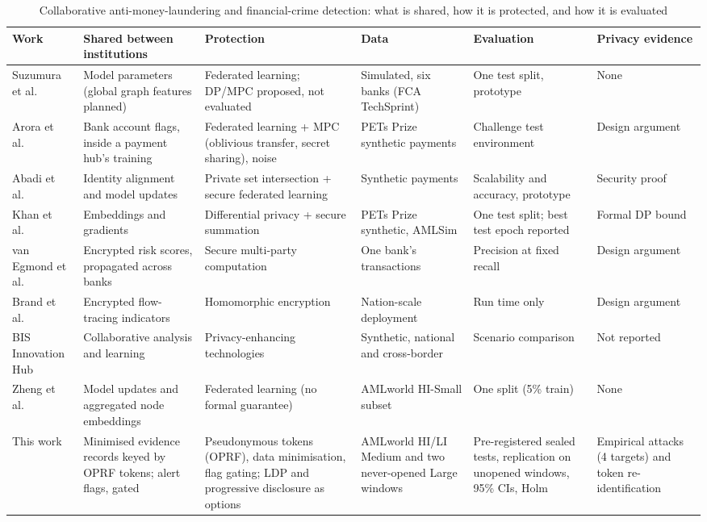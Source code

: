 \begin{table}[!t]
\centering
\caption{Collaborative anti-money-laundering and financial-crime detection: what is shared, how it is protected, and how it is evaluated}
\label{tab:related}
\footnotesize
\setlength{\tabcolsep}{3pt}
\begin{tabular}{*{6}{>{\raggedright\arraybackslash}p{2.55cm}}}
\hline
Work & Shared between institutions & Protection & Data & Evaluation & Privacy evidence \\
\hline
Suzumura et al.\ \cite{suzumura2019} & Model parameters (global graph features planned) & Federated learning; DP/MPC proposed, not evaluated & Simulated, six banks (FCA TechSprint) & One test split, prototype & None \\
Arora et al.\ \cite{arora2023} & Bank account flags, inside a payment hub's training & Federated learning + MPC (oblivious transfer, secret sharing), noise & PETs Prize synthetic payments & Challenge test environment & Design argument \\
Abadi et al.\ \cite{abadi2024starlit} & Identity alignment and model updates & Private set intersection + secure federated learning & Synthetic payments & Scalability and accuracy, prototype & Security proof \\
Khan et al.\ \cite{khan2024fedrd} & Embeddings and gradients & Differential privacy + secure summation & PETs Prize synthetic, AMLSim & One test split; best test epoch reported & Formal DP bound \\
van Egmond et al.\ \cite{vanegmond2024} & Encrypted risk scores, propagated across banks & Secure multi-party computation & One bank's transactions & Precision at fixed recall & Design argument \\
Brand et al.\ \cite{brand2023fintracer} & Encrypted flow-tracing indicators & Homomorphic encryption & Nation-scale deployment & Run time only & Design argument \\
BIS Innovation Hub \cite{bis2023aurora} & Collaborative analysis and learning & Privacy-enhancing technologies & Synthetic, national and cross-border & Scenario comparison & Not reported \\
Zheng et al.\ \cite{zheng2025} & Model updates and aggregated node embeddings & Federated learning (no formal guarantee) & AMLworld HI-Small subset \cite{altman2023} & One split (5\% train) & None \\
\hline
This work & Minimised evidence records keyed by OPRF tokens; alert flags, gated & Pseudonymous tokens (OPRF), data minimisation, flag gating; LDP and progressive disclosure as options & AMLworld HI/LI Medium and two never-opened Large windows \cite{altman2023} & Pre-registered sealed tests, replication on unopened windows, 95\% CIs, Holm & Empirical attacks (4 targets) and token re-identification \\
\hline
\end{tabular}
\end{table}
